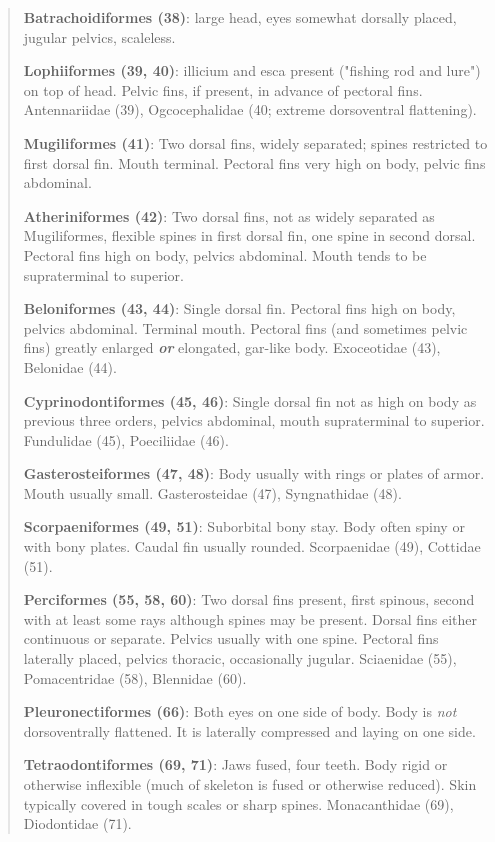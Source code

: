 \documentclass[12pt, hidelinks]{exam}
\begin{document}
\begin{quote}
\textbf{Batrachoidiformes (38)}: large head, eyes somewhat dorsally
placed, jugular pelvics, scaleless.

\textbf{Lophiiformes (39, 40)}: illicium and esca present ("fishing rod and lure") on top of head. Pelvic fins, if
present, in advance of pectoral fins. Antennariidae (39), Ogcocephalidae
(40; extreme dorsoventral flattening).

\textbf{Mugiliformes (41)}: Two dorsal fins, widely separated; spines
restricted to first dorsal fin. Mouth terminal. Pectoral fins very high
on body, pelvic fins abdominal.

\textbf{Atheriniformes (42)}: Two dorsal fins, not as widely separated
as Mugiliformes, flexible spines in first dorsal fin, one spine in
second dorsal. Pectoral fins high on body, pelvics abdominal. Mouth
tends to be supraterminal to superior.

\textbf{Beloniformes (43, 44)}: Single dorsal fin. Pectoral fins high on
body, pelvics abdominal. Terminal mouth. Pectoral fins (and sometimes
pelvic fins) greatly enlarged \emph{\textbf{or}} elongated, gar-like
body. Exoceotidae (43), Belonidae (44).

\textbf{Cyprinodontiformes (45, 46)}: Single dorsal fin not as high on
body as previous three orders, pelvics abdominal, mouth supraterminal to
superior. Fundulidae (45), Poeciliidae (46).

\textbf{Gasterosteiformes (47, 48)}: Body usually with rings or plates
of armor. Mouth usually small. Gasterosteidae (47), Syngnathidae (48).

\textbf{Scorpaeniformes (49, 51)}: Suborbital bony stay. Body often
spiny or with bony plates. Caudal fin usually rounded. Scorpaenidae
(49), Cottidae (51).

\textbf{Perciformes (55, 58, 60)}: Two dorsal fins present, first
spinous, second with at least some rays although spines may be present.
Dorsal fins either continuous or separate. Pelvics usually with one
spine. Pectoral fins laterally placed, pelvics thoracic, occasionally
jugular. Sciaenidae (55), Pomacentridae (58), Blennidae (60).%

\textbf{Pleuronectiformes (66)}: Both eyes on one side of body. Body is
\emph{not} dorsoventrally flattened. It is laterally compressed and laying on one side.

\textbf{Tetraodontiformes (69, 71)}: Jaws fused, four teeth. Body rigid
or otherwise inflexible (much of skeleton is fused or otherwise
reduced). Skin typically covered in tough scales or sharp spines.
Monacanthidae (69), Diodontidae (71).
\end{quote}
\end{document}

